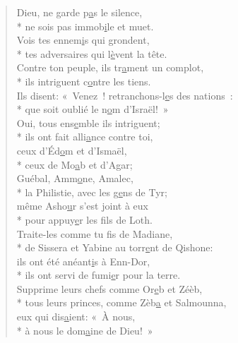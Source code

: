 
\begin{verse}
Dieu, ne garde p\underline{a}s le silence, \\*
ne sois pas immob\underline{i}le et muet. \\
Vois tes ennem\underline{i}s qui grondent, \\*
tes adversaires qui l\underline{è}vent la tête. \\

Contre ton peuple, ils tr\underline{a}ment un complot, \\*
ils intriguent c\underline{o}ntre les tiens. \\
Ils disent: « Venez ! retranchons-l\underline{e}s des nations : \\*
que soit oublié le n\underline{o}m d’Israël! » \\

Oui, tous ens\underline{e}mble ils intriguent; \\*
ils ont fait alli\underline{a}nce contre toi, \\
ceux d’Éd\underline{o}m et d’Ismaël, \\*
ceux de Mo\underline{a}b et d’Agar; \\

Guébal, Amm\underline{o}ne, Amalec, \\*
la Philistie, avec les g\underline{e}ns de Tyr; \\
même Asho\underline{u}r s’est joint à eux \\*
pour appuy\underline{e}r les fils de Loth. \\

Traite-les comme tu f\underline{i}s de Madiane, \\*
de Sissera et Yabine au torr\underline{e}nt de Qishone: \\
ils ont été anéant\underline{i}s à Enn-Dor, \\*
ils ont servi de fumi\underline{e}r pour la terre. \\

Supprime leurs chefs comme Or\underline{e}b et Zéèb, \\*
tous leurs princes, comme Zèb\underline{a} et Salmounna, \\
eux qui dis\underline{a}ient: « À nous, \\*
à nous le dom\underline{a}ine de Dieu! » \\


\end{verse}
